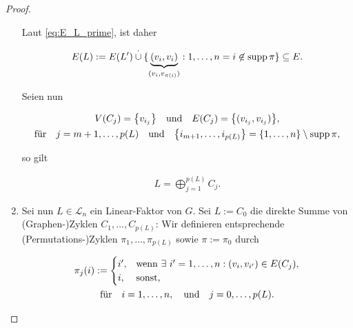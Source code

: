 \begin{proof}
\begin{enumerate}[label = \arabic*.]
                Laut \eqref{eq:E_L_prime}, ist daher

                \begin{align*}
                    E(L)
                    :=
                    E(L^\prime) \overset{\cdot}{\cup} \{ \underbrace{(v_i, v_i)}_{(v_i, v_{\pi(i)})}: 1, \dots, n = i \not \in \operatorname{supp} \pi \}
                    \subseteq
                    E.
                \end{align*}

                Seien nun

                \begin{gather*}
                    V(C_j) = {\left \{ v_{i_j} \right \}}
                    \quad
                    \text{und}
                    \quad
                    E(C_j) = {\left \{ (v_{i_j}, v_{i_j}) \right \}}, \\
                    \text{für}
                    \quad
                    j = m + 1, \dots, p(L)
                    \quad
                    \text{und}
                    \quad
                    {\left \{ i_{m+1}, \dots, i_{p(L)} \right \}} = {\left \{ 1, \dots, n \right \}} \setminus \operatorname{supp} \pi,
                \end{gather*}

                so gilt

                \begin{align*}
                    L = \bigoplus_{j=1}^{p(L)} C_j.
                \end{align*}

                \item Sei nun $L \in \mathcal L_n$ ein Linear-Faktor von $G$.
                Sei $L := C_0$ die direkte Summe von (Graphen-)Zyklen $C_1, \dots, C_{p(L)}$:
                Wir definieren entsprechende (Permutations-)Zyklen $\pi_1, \dots, \pi_{p(L)}$ sowie $\pi := \pi_0$ durch

                \begin{multline*}
                    \pi_j(i)
                    :=
                    \begin{cases}
                        i^\prime, & \text{wenn} ~ \exists ~ i^\prime = 1, \dots, n: (v_i, v_{i^\prime}) \in E(C_j), \\
                        i,        & \text{sonst},
                    \end{cases} \\
                    \text{für}
                    \quad
                    i = 1, \dots, n,
                    \quad
                    \text{und}
                    \quad
                    j = 0, \dots, p(L).
                \end{multline*}


\end{enumerate}
\end{proof}
